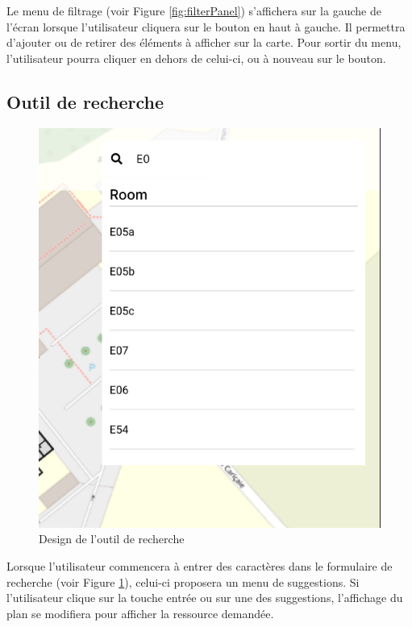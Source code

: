 \documentclass[
    iai, %
    il, %
]{heig-tb}
\begin{document}
Le menu de filtrage (voir Figure \ref{fig:filterPanel}) s'affichera sur la gauche de l'écran lorsque l'utilisateur cliquera sur le bouton en haut à gauche.
Il permettra d'ajouter ou de retirer des éléments à afficher sur la carte.
Pour sortir du menu, l'utilisateur pourra cliquer en dehors de celui-ci, ou à nouveau sur le bouton.

\subsection{Outil de recherche}

\begin{figure}[h]
    \centering
    \includegraphics[scale=0.3]{designRecherche.png}
    \caption{Design de l'outil de recherche}
    \label{fig:searchBar}
\end{figure}

Lorsque l'utilisateur commencera à entrer des caractères dans le formulaire de recherche (voir Figure \ref{fig:searchBar}), celui-ci proposera un menu de suggestions.
Si l'utilisateur clique sur la touche entrée ou sur une des suggestions, l'affichage du plan se modifiera pour afficher la ressource demandée.
\end{document}
